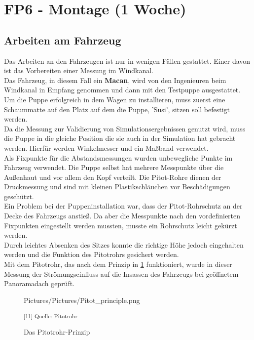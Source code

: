 \newpage
\section{FP6 - Montage (1 Woche)}

\subsection{Arbeiten am Fahrzeug}

Das Arbeiten an den Fahrzeugen ist nur in wenigen Fällen gestattet. Einer davon ist das Vorbereiten einer Messung im Windkanal. \\

Das Fahrzeug, in diesem Fall ein \textbf{Macan},  wird von den Ingenieuren beim Windkanal in Empfang genommen und dann mit den Testpuppe ausgestattet. \\

Um die Puppe erfolgreich in dem Wagen zu installieren, muss zuerst eine Schaummatte auf den Platz auf dem die Puppe, 'Susi', sitzen soll befestigt werden. \\
Da die Messung zur Validierung von Simulationsergebnissen genutzt wird, muss die Puppe in die gleiche Position die sie auch in der Simulation hat gebracht werden. Hierfür werden Winkelmesser und ein Maßband verwendet. \\
Als Fixpunkte für die Abstandsmessungen wurden unbewegliche Punkte im Fahrzeug verwendet. Die Puppe selbst hat mehrere Messpunkte über die Außenhaut und vor allem den Kopf verteilt. Die Pitot-Rohre dienen der Druckmessung und sind mit kleinen Plastikschläuchen vor Beschädigungen geschützt. \\
Ein Problem bei der Puppeninstallation war, dass der Pitot-Rohrschutz an der Decke des Fahrzeugs anstieß. Da aber die Messpunkte nach den vordefinierten Fixpunkten eingestellt werden mussten, musste ein Rohrschutz leicht gekürzt werden. \\
Durch leichtes Absenken des Sitzes konnte die richtige Höhe jedoch eingehalten werden und die Funktion des Pitotrohrs gesichert werden.\\

Mit dem Pitotrohr, das nach dem Prinzip in \ref{Pitot} funktioniert, wurde in dieser Messung der Strömungseinfluss auf die Insassen des Fahrzeugs bei geöffnetem Panoramadach geprüft. 

\begin{figure}[H]
	\begin{center}
		\begin{overpic}[width=\linewidth]{Pictures/Pictures/Pitot_principle.png}
			
		\end{overpic}
		
		
		\caption{Das Pitotrohr-Prinzip}
		
		\small\textsuperscript{[11] Quelle: \href{https://www.wikiwand.com/de/Pitotrohr}{Pitotrohr}}
		\label{Pitot}
	\end{center}
\end{figure} 
